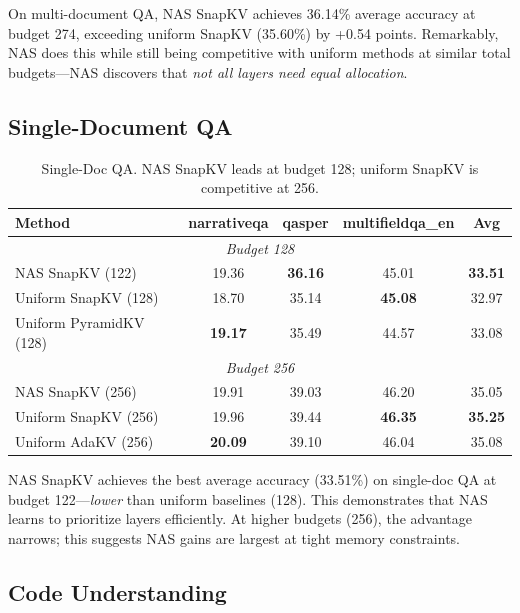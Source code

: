 \documentclass[11pt,a4paper]{article}
\begin{document}
On multi-document QA, NAS SnapKV achieves 36.14\% average accuracy at budget 274, exceeding uniform SnapKV (35.60\%) by +0.54 points. Remarkably, NAS does this while still being competitive with uniform methods at similar total budgets—NAS discovers that \emph{not all layers need equal allocation}.

\subsection{Single-Document QA}

\begin{table}[t]
\centering
\small
\begin{tabular}{l c c c c}
\toprule
\textbf{Method} & \textbf{narrativeqa} & \textbf{qasper} & \textbf{multifieldqa\_en} & \textbf{Avg} \\
\midrule
\multicolumn{5}{c}{\textit{Budget 128}} \\
NAS SnapKV (122) & 19.36 & \textbf{36.16} & 45.01 & \textbf{33.51} \\
Uniform SnapKV (128) & 18.70 & 35.14 & \textbf{45.08} & 32.97 \\
Uniform PyramidKV (128) & \textbf{19.17} & 35.49 & 44.57 & 33.08 \\
\midrule
\multicolumn{5}{c}{\textit{Budget 256}} \\
NAS SnapKV (256) & 19.91 & 39.03 & 46.20 & 35.05 \\
Uniform SnapKV (256) & 19.96 & 39.44 & \textbf{46.35} & \textbf{35.25} \\
Uniform AdaKV (256) & \textbf{20.09} & 39.10 & 46.04 & 35.08 \\
\bottomrule
\end{tabular}
\caption{Single-Doc QA. NAS SnapKV leads at budget 128; uniform SnapKV is competitive at 256.}
\label{tab:singledoc}
\end{table}

NAS SnapKV achieves the best average accuracy (33.51\%) on single-doc QA at budget 122—\emph{lower} than uniform baselines (128). This demonstrates that NAS learns to prioritize layers efficiently. At higher budgets (256), the advantage narrows; this suggests NAS gains are largest at tight memory constraints.

\subsection{Code Understanding}
\end{document}
